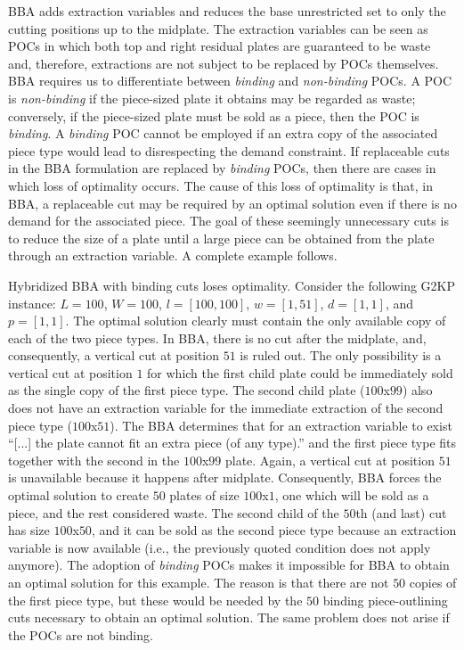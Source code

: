 \documentclass[ppgc,tese,english,formais,babel]{iiufrgs}
\begin{document}
BBA adds extraction variables and reduces the base unrestricted set to only the cutting positions up to the midplate.
The extraction variables can be seen as POCs in which both top and right residual plates are guaranteed to be waste and, therefore, extractions are not subject to be replaced by POCs themselves.
BBA requires us to differentiate between \emph{binding} and \emph{non-binding} POCs.
A POC is \emph{non-binding} if the piece-sized plate it obtains may be regarded as waste; conversely, if the piece-sized plate must be sold as a piece, then the POC is \emph{binding}.
A \emph{binding} POC cannot be employed if an extra copy of the associated piece type would lead to disrespecting the demand constraint.
If replaceable cuts in the BBA formulation are replaced by \emph{binding} POCs, then there are cases in which loss of optimality occurs.
The cause of this loss of optimality is that, in BBA, a replaceable cut may be required by an optimal solution even if there is no demand for the associated piece.
The goal of these seemingly unnecessary cuts is to reduce the size of a plate until a large piece can be obtained from the plate through an extraction variable.
A complete example follows.

\begin{example}{Hybridized BBA with binding cuts loses optimality.}
Consider the following G2KP instance: \(L = 100\), \(W = 100\), \(l = [100, 100]\), \(w = [1, 51]\), \(d = [1, 1]\), and \(p = [1, 1]\).
The optimal solution clearly must contain the only available copy of each of the two piece types.
In BBA, there is no cut after the midplate, and, consequently, a vertical cut at position \(51\) is ruled out.
The only possibility is a vertical cut at position \(1\) for which the first child plate could be immediately sold as the single copy of the first piece type.
The second child plate (\(100\)x\(99\)) also does not have an extraction variable for the immediate extraction of the second piece type (\(100\)x\(51\)).
The BBA determines that for an extraction variable to exist ``[...] the plate cannot fit an extra piece (of any type).'' and the first piece type fits together with the second in the \(100\)x\(99\) plate.
Again, a vertical cut at position \(51\) is unavailable because it happens after midplate.
Consequently, BBA forces the optimal solution to create \(50\) plates of size \(100\)x\(1\), one which will be sold as a piece, and the rest considered waste.
The second child of the \(50\)th (and last) cut has size \(100\)x\(50\), and it can be sold as the second piece type because an extraction variable is now available (i.e., the previously quoted condition does not apply anymore).
The adoption of \emph{binding} POCs makes it impossible for BBA to obtain an optimal solution for this example.
The reason is that there are not \(50\) copies of the first piece type, but these would be needed by the \(50\) binding piece-outlining cuts necessary to obtain an optimal solution.
The same problem does not arise if the POCs are not binding.
\end{example}
\end{document}
